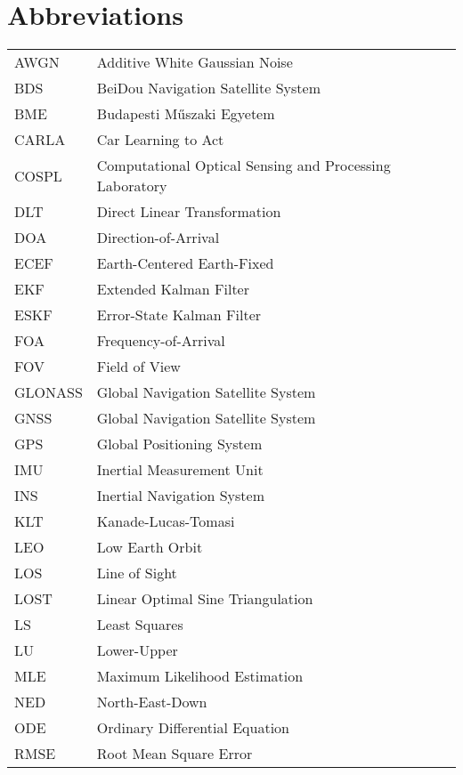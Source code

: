 \chapter*{Abbreviations}

\renewcommand*{\arraystretch}{1}
\begin{longtable}{l l}
    AWGN & Additive White Gaussian Noise \\
    BDS & BeiDou Navigation Satellite System \\
    BME & Budapesti Műszaki Egyetem \\
    CARLA & Car Learning to Act \\
    COSPL & Computational Optical Sensing and Processing Laboratory \\
    DLT & Direct Linear Transformation \\
    DOA & Direction-of-Arrival \\
    ECEF & Earth-Centered Earth-Fixed \\
    EKF & Extended Kalman Filter \\
    ESKF & Error-State Kalman Filter \\
    FOA & Frequency-of-Arrival \\
    FOV & Field of View \\
    GLONASS & Global Navigation Satellite System \\
    GNSS & Global Navigation Satellite System \\
    GPS & Global Positioning System \\
    IMU & Inertial Measurement Unit \\
    INS & Inertial Navigation System \\
    KLT & Kanade-Lucas-Tomasi \\
    LEO & Low Earth Orbit \\
    LOS & Line of Sight \\
    LOST & Linear Optimal Sine Triangulation \\
    LS & Least Squares \\
    LU & Lower-Upper \\
    MLE & Maximum Likelihood Estimation \\
    NED & North-East-Down \\
    ODE & Ordinary Differential Equation \\
    RMSE & Root Mean Square Error \\

\end{longtable}
